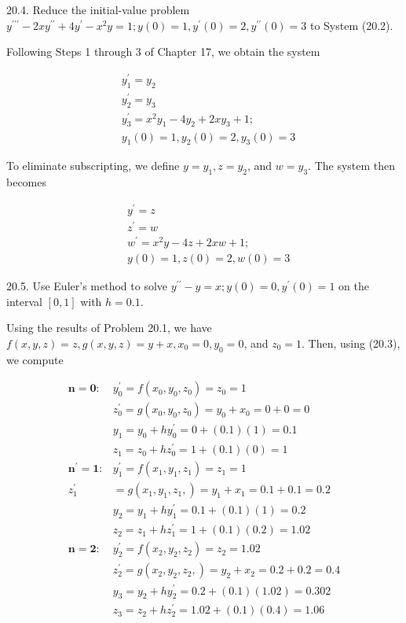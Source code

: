 \documentclass[10pt]{article}
\begin{document}
20.4. Reduce the initial-value problem $y^{\prime \prime \prime}-2 x y^{\prime \prime}+4 y^{\prime}-x^{2} y=1 ; y(0)=1, y^{\prime}(0)=2, y^{\prime \prime}(0)=3$ to System (20.2).

Following Steps 1 through 3 of Chapter 17, we obtain the system

$$
\begin{aligned}
& y_{1}^{\prime}=y_{2} \\
& y_{2}^{\prime}=y_{3} \\
& y_{3}^{\prime}=x^{2} y_{1}-4 y_{2}+2 x y_{3}+1 ; \\
& y_{1}(0)=1, y_{2}(0)=2, y_{3}(0)=3
\end{aligned}
$$

To eliminate subscripting, we define $y=y_{1}, z=y_{2}$, and $w=y_{3}$. The system then becomes

$$
\begin{aligned}
& y^{\prime}=z \\
& z^{\prime}=w \\
& w^{\prime}=x^{2} y-4 z+2 x w+1 ; \\
& y(0)=1, z(0)=2, w(0)=3
\end{aligned}
$$

20.5. Use Euler's method to solve $y^{\prime \prime}-y=x ; y(0)=0, y^{\prime}(0)=1$ on the interval $[0,1]$ with $h=0.1$.

Using the results of Problem 20.1, we have $f(x, y, z)=z, g(x, y, z)=y+x, x_{0}=0, y_{0}=0$, and $z_{0}=1$. Then, using (20.3), we compute

$$
\begin{array}{ll}
\mathbf{n = 0}: & y_{0}^{\prime}=f\left(x_{0}, y_{0}, z_{0}\right)=z_{0}=1 \\
& z_{0}^{\prime}=g\left(x_{0}, y_{0}, z_{0}\right)=y_{0}+x_{0}=0+0=0 \\
& y_{1}=y_{0}+h y_{0}^{\prime}=0+(0.1)(1)=0.1 \\
& z_{1}=z_{0}+h z_{0}^{\prime}=1+(0.1)(0)=1 \\
\boldsymbol{n}^{\prime}=\mathbf{1}: & y_{1}^{\prime}=f\left(x_{1}, y_{1}, z_{1}\right)=z_{1}=1 \\
z_{1}^{\prime} & =g\left(x_{1}, y_{1}, z_{1},\right)=y_{1}+x_{1}=0.1+0.1=0.2 \\
& y_{2}=y_{1}+h y_{1}^{\prime}=0.1+(0.1)(1)=0.2 \\
& z_{2}=z_{1}+h z_{1}^{\prime}=1+(0.1)(0.2)=1.02 \\
\mathbf{n = 2}: & y_{2}^{\prime}=f\left(x_{2}, y_{2}, z_{2}\right)=z_{2}=1.02 \\
& z_{2}^{\prime}=g\left(x_{2}, y_{2}, z_{2},\right)=y_{2}+x_{2}=0.2+0.2=0.4 \\
& y_{3}=y_{2}+h y_{2}^{\prime}=0.2+(0.1)(1.02)=0.302 \\
& z_{3}=z_{2}+h z_{2}^{\prime}=1.02+(0.1)(0.4)=1.06
\end{array}
$$
\end{document}
